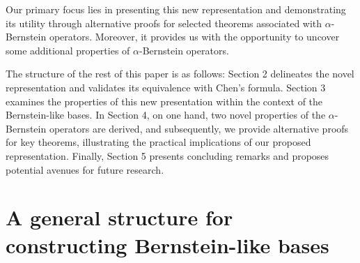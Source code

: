 \documentclass[preprint,12pt]{elsarticle}
\theoremstyle{definition}
\theoremstyle{theorem}
\theoremstyle{lemma}
\theoremstyle{example}
\theoremstyle{remark}
\theoremstyle{prop}
\begin{document}

Our primary focus lies in presenting this new representation and demonstrating its utility through  alternative  proofs for selected theorems associated with $\alpha$-Bernstein operators.
Moreover, it provides us with the opportunity to uncover some additional properties of $\alpha$-Bernstein operators.



The structure of the rest of this paper is as follows: Section 2 delineates the novel representation and validates its equivalence with Chen's formula. Section 3 examines the properties of this new presentation within the context of the Bernstein-like bases. In Section 4, on one hand, two novel properties of the $\alpha$-Bernstein operators are derived, and subsequently, we provide alternative proofs for key theorems, illustrating the practical implications of our proposed representation. Finally, Section 5 presents concluding remarks and proposes potential avenues for future research.


\section{A general structure for constructing Bernstein-like bases}
\end{document}
